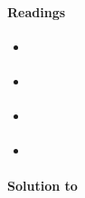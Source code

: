 \paragraph{Readings}
\begin{itemize}
	\item \textcite[App. C]{Lutkepohl_2005_NewIntroductionMultiple}
	\item \textcite[App. C]{Neusser_2016_TimeSeriesEconometrics}
	\item \textcite{Ploberger_2010_LawLargeNumbers}
	\item \textcite[Ch. 3]{White_2001_AsymptoticTheoryEconometricians}
\end{itemize}

\begin{solution}\textbf{Solution to }
\ifDisplaySolutions

\fi
\newpage
\end{solution}